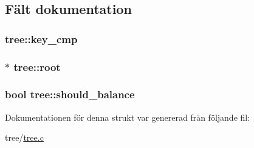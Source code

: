 \subsection{Fält dokumentation}
\hypertarget{structtree_ad2c95bd73b4c3f1ace5705b380c971cb}{
\subsubsection[{key\+\_\+cmp}]{ tree\+::key\+\_\+cmp}}\label{structtree_ad2c95bd73b4c3f1ace5705b380c971cb}
\hypertarget{structtree_a752f44752a2b0a0ba6fb3f434d7feea6}{
\subsubsection[{root}]{$\ast$ tree\+::root}}\label{structtree_a752f44752a2b0a0ba6fb3f434d7feea6}
\hypertarget{structtree_a71c5140877d3e8978670898bfb87cb07}{
\subsubsection[{should\+\_\+balance}]{\setlength{\rightskip}{0pt plus 5cm}bool tree\+::should\+\_\+balance}}\label{structtree_a71c5140877d3e8978670898bfb87cb07}


Dokumentationen för denna strukt var genererad från följande fil\+:\begin{DoxyCompactItemize}
\item 
tree/\hyperlink{tree_8c}{tree.\+c}\end{DoxyCompactItemize}
